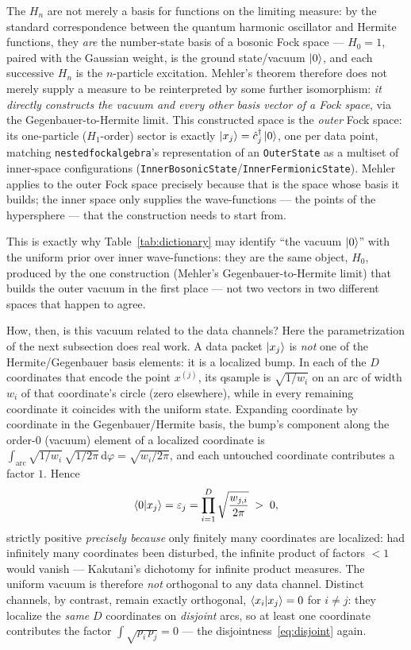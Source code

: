 \documentclass[11pt, a4paper]{article}
\begin{document}
The $H_n$ are not merely a basis for functions on the limiting measure: by
the standard correspondence between the quantum harmonic oscillator and
Hermite functions, they \emph{are} the number-state basis of a bosonic Fock
space --- $H_0=1$, paired with the Gaussian weight, is the ground
state/vacuum $\ket{0}$, and each successive $H_n$ is the $n$-particle
excitation. Mehler's theorem therefore does not merely supply a measure to
be reinterpreted by some further isomorphism: \emph{it directly constructs
the vacuum and every other basis vector of a Fock space}, via the
Gegenbauer-to-Hermite limit. This constructed space is the \emph{outer} Fock
space: its one-particle ($H_1$-order) sector is exactly
$\ket{x_j}=\hat c_j^\dagger\ket{0}$, one per data point, matching
\texttt{nested\textunderscore fock\textunderscore algebra}'s representation
of an \texttt{OuterState} as a multiset of inner-space configurations
(\texttt{InnerBosonicState}/\texttt{InnerFermionicState}). Mehler applies to
the outer Fock space precisely because that is the space whose basis it
builds; the inner space only supplies the wave-functions --- the points of
the hypersphere --- that the construction needs to start from.

This is exactly why Table~\ref{tab:dictionary} may identify ``the vacuum
$\ket{0}$'' with the uniform prior over inner wave-functions: they are the
same object, $H_0$, produced by the one construction (Mehler's
Gegenbauer-to-Hermite limit) that builds the outer vacuum in the first
place --- not two vectors in two different spaces that happen to agree.

How, then, is this vacuum related to the data channels? Here the
parametrization of the next subsection does real work. A data packet
$\ket{x_j}$ is \emph{not} one of the Hermite/Gegenbauer basis elements: it
is a localized bump. In each of the $D$ coordinates that encode the point
$x^{(j)}$, its qsample is $\sqrt{1/w_i}$ on an arc of width $w_i$ of that
coordinate's circle (zero elsewhere), while in every remaining coordinate
it coincides with the uniform state. Expanding coordinate by coordinate in
the Gegenbauer/Hermite basis, the bump's component along the order-0
(vacuum) element of a localized coordinate is
$\int_{\mathrm{arc}}\sqrt{1/w_i}\,\sqrt{1/2\pi}\,\mathrm{d}\varphi
=\sqrt{w_i/2\pi}$, and each untouched coordinate contributes a factor $1$.
Hence
\begin{equation}
  \braket{0|x_j}=\varepsilon_j
  =\prod_{i=1}^{D}\sqrt{\frac{w_{j,i}}{2\pi}}\;>\;0 ,
  \label{eq:mehleroverlap}
\end{equation}
strictly positive \emph{precisely because} only finitely many coordinates
are localized: had infinitely many coordinates been disturbed, the infinite
product of factors $<1$ would vanish --- Kakutani's dichotomy for infinite
product measures. The uniform vacuum is therefore \emph{not} orthogonal to
any data channel. Distinct channels, by contrast, remain exactly
orthogonal, $\braket{x_i|x_j}=0$ for $i\neq j$: they localize the
\emph{same} $D$ coordinates on \emph{disjoint} arcs, so at least one
coordinate contributes the factor $\int\sqrt{p_i\,p_j}=0$ --- the
disjointness~\eqref{eq:disjoint} again.
\end{document}
